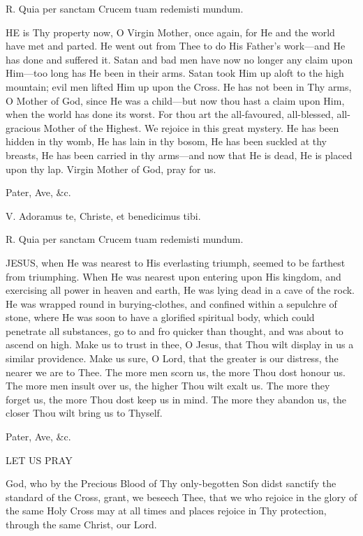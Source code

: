 R. Quia per sanctam Crucem tuam redemisti mundum.

HE is Thy property
now, O Virgin Mother, once again, for He and the world have met and
parted. He went out from Thee to do His Father's work—and He has done
and suffered it. Satan and bad men have now no longer any claim upon
Him—too long has He been in their arms. Satan took Him up aloft to the
high mountain; evil men lifted Him up upon the Cross. He has not been in
Thy arms, O Mother of God, since He was a child—but now thou hast a
claim upon Him, when the world has done its worst. For thou art the all-favoured,
all-blessed, all-gracious Mother of the Highest. We rejoice in this
great mystery. He has been hidden in thy womb, He has lain in thy bosom,
He has been suckled at thy breasts, He has been carried in thy
arms—and now that He is dead, He is placed upon thy lap. Virgin Mother
of God, pray for us.

Pater, Ave, \&c.


V. Adoramus te, Christe, et
benedicimus tibi.

R. Quia per sanctam Crucem tuam redemisti mundum.

JESUS, when He was
nearest to His everlasting triumph, seemed to be farthest from
triumphing. When He was nearest upon entering upon His kingdom, and
exercising all power in heaven and earth, He was lying dead in a cave of
the rock. He was wrapped round in burying-clothes, and confined within a
sepulchre of stone, where He was soon to have a glorified spiritual
body, which could penetrate all substances, go to and fro quicker than
thought, and was about to ascend on high. Make us to trust in thee, O
Jesus, that Thou wilt display in us a similar providence. Make us sure,
O Lord, that the greater is our distress, the nearer we are to Thee. The
more men scorn us, the more Thou dost honour us. The more men insult
over us, the higher Thou wilt exalt us. The more they forget us, the
more Thou dost keep us in mind. The more they abandon us, the closer
Thou wilt bring us to Thyself.

Pater, Ave, \&c.

LET
US PRAY

God, who by the Precious Blood
of Thy only-begotten Son didst sanctify the standard of the Cross,
grant, we beseech Thee, that we who rejoice in the glory of the same
Holy Cross may at all times and places rejoice in Thy protection,
through the same Christ, our Lord.

